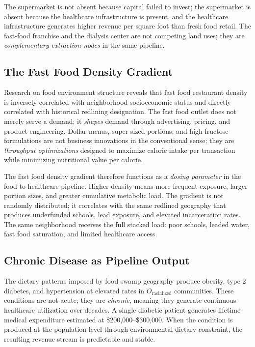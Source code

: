 The supermarket is not absent because capital failed to invest; the supermarket is absent because the healthcare infrastructure is present, and the healthcare infrastructure generates higher revenue per square foot than fresh food retail. The fast-food franchise and the dialysis center are not competing land uses; they are \textit{complementary extraction nodes} in the same pipeline.

\subsection{The Fast Food Density Gradient}

Research on food environment structure reveals that fast food restaurant density is inversely correlated with neighborhood socioeconomic status and directly correlated with historical redlining designation. The fast food outlet does not merely serve a demand; it \textit{shapes} demand through advertising, pricing, and product engineering. Dollar menus, super-sized portions, and high-fructose formulations are not business innovations in the conventional sense; they are \textit{throughput optimizations} designed to maximize caloric intake per transaction while minimizing nutritional value per calorie.

The fast food density gradient therefore functions as a \textit{dosing parameter} in the food-to-healthcare pipeline. Higher density means more frequent exposure, larger portion sizes, and greater cumulative metabolic load. The gradient is not randomly distributed; it correlates with the same redlined geography that produces underfunded schools, lead exposure, and elevated incarceration rates. The same neighborhood receives the full stacked load: poor schools, leaded water, fast food saturation, and limited healthcare access.

\subsection{Chronic Disease as Pipeline Output}

The dietary patterns imposed by food swamp geography produce obesity, type 2 diabetes, and hypertension at elevated rates in $O_{\text{racialized}}$ communities. These conditions are not acute; they are \textit{chronic}, meaning they generate continuous healthcare utilization over decades. A single diabetic patient generates lifetime medical expenditure estimated at \$200,000--\$300,000. When the condition is produced at the population level through environmental dietary constraint, the resulting revenue stream is predictable and stable.

